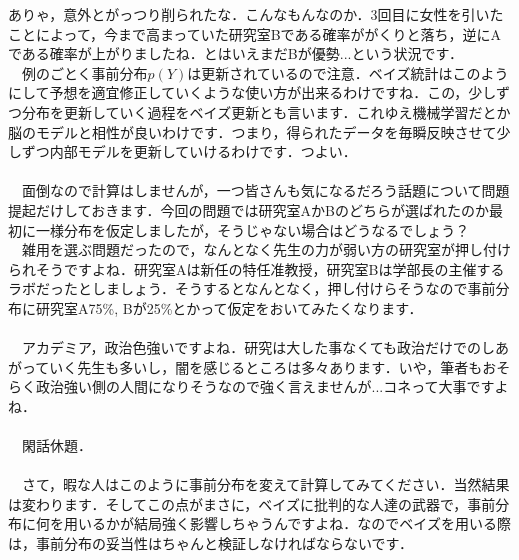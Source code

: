 \documentclass[11pt,a4paper]{jsarticle}                    %
\begin{document}
ありゃ，意外とがっつり削られたな．こんなもんなのか．3回目に女性を引いたことによって，今まで高まっていた研究室Bである確率ががくりと落ち，逆にAである確率が上がりましたね．とはいえまだBが優勢...という状況です．\\
　例のごとく事前分布$p(Y)$は更新されているので注意．ベイズ統計はこのようにして予想を適宜修正していくような使い方が出来るわけですね．この，少しずつ分布を更新していく過程をベイズ更新とも言います．これゆえ機械学習だとか脳のモデルと相性が良いわけです．つまり，得られたデータを毎瞬反映させて少しずつ内部モデルを更新していけるわけです．つよい．\\
\\
　面倒なので計算はしませんが，一つ皆さんも気になるだろう話題について問題提起だけしておきます．今回の問題では研究室AかBのどちらが選ばれたのか最初に一様分布を仮定しましたが，そうじゃない場合はどうなるでしょう？\\
　雑用を選ぶ問題だったので，なんとなく先生の力が弱い方の研究室が押し付けられそうですよね．研究室Aは新任の特任准教授，研究室Bは学部長の主催するラボだったとしましょう．そうするとなんとなく，押し付けらそうなので事前分布に研究室A75\%, Bが25\%とかって仮定をおいてみたくなります．\\
\\
　アカデミア，政治色強いですよね．研究は大した事なくても政治だけでのしあがっていく先生も多いし，闇を感じるところは多々あります．いや，筆者もおそらく政治強い側の人間になりそうなので強く言えませんが...コネって大事ですよね．\\
\\
　閑話休題．
\\
\\
　さて，暇な人はこのように事前分布を変えて計算してみてください．当然結果は変わります．そしてこの点がまさに，ベイズに批判的な人達の武器で，事前分布に何を用いるかが結局強く影響しちゃうんですよね．なのでベイズを用いる際は，事前分布の妥当性はちゃんと検証しなければならないです．
\end{document}
